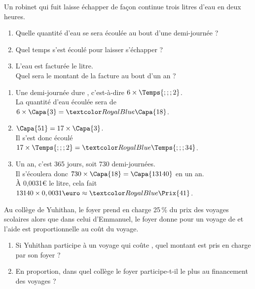 \begin{Maquette}[Fiche,CorrigeFin,Colonnes=2]{}
\begin{multicols}{2}
      \begin{exercice}[Dur] %
         Un robinet qui fuit laisse échapper de façon continue trois litres d’eau en deux heures.
         \begin{enumerate}
            \item Quelle quantité d’eau se sera écoulée au bout d’une demi-journée ?
            \item Quel temps s’est écoulé pour laisser s’échapper  ?
            \item L’eau est facturée  le litre. \\
               Quel sera le montant de la facture au bout d’un an ?
         \end{enumerate}
      \end{exercice}
      
      \begin{Solution}
         \begin{enumerate}
            \item Une demi-journée dure , c'est-à-dire $6\times\Temps{;;;2}$. \\
               La quantité d'eau écoulée sera de $6\times\Capa{3} =\cor{\Capa{18}}$.
            \item $\Capa{51} =17\times\Capa{3}$. \\
               Il s'est donc écoulé $17\times\Temps{;;;2} =\cor{\Temps{;;;34}}$.
            \item Un an, c'est 365 jours, soit 730 demi-journées. \\
               Il s'écoulera donc $730\times\Capa{18} =\Capa{13140}$ en un an. \\
               À 0,0031\euro{} le litre, cela fait $13140\times0,0031\text{\euro} \approx\cor{\Prix{41}}$.
         \end{enumerate}
      \end{Solution}
      
      
      \begin{exercice} %
         Au collège de Yuhithan, le foyer prend en charge 25\,\% du prix des voyages scolaires alors que dans celui d'Emmanuel, le foyer donne  pour un voyage de  et l'aide est proportionnelle au coût du voyage.
         \begin{enumerate}
            \item Si Yuhithan participe à un voyage qui coûte , quel montant est pris en charge par son foyer ?
            \item En proportion, dans quel collège le foyer participe-t-il le plus au financement des voyages ?
         \end{enumerate}
      \end{exercice}
      

\end{multicols}
\end{Maquette}
